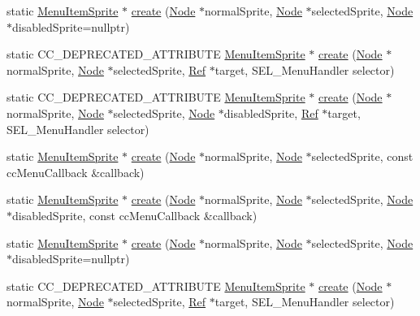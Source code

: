 \begin{DoxyCompactItemize}
\item 
static \hyperlink{classMenuItemSprite}{Menu\+Item\+Sprite} $\ast$ \hyperlink{classMenuItemSprite_ace4cc0187ff161f1fc3b2d0877b5b00f}{create} (\hyperlink{classNode}{Node} $\ast$normal\+Sprite, \hyperlink{classNode}{Node} $\ast$selected\+Sprite, \hyperlink{classNode}{Node} $\ast$disabled\+Sprite=nullptr)
\item 
static C\+C\+\_\+\+D\+E\+P\+R\+E\+C\+A\+T\+E\+D\+\_\+\+A\+T\+T\+R\+I\+B\+U\+TE \hyperlink{classMenuItemSprite}{Menu\+Item\+Sprite} $\ast$ \hyperlink{classMenuItemSprite_a96aec305060ca3ab7ce8e15de7d7d3ff}{create} (\hyperlink{classNode}{Node} $\ast$normal\+Sprite, \hyperlink{classNode}{Node} $\ast$selected\+Sprite, \hyperlink{classRef}{Ref} $\ast$target, S\+E\+L\+\_\+\+Menu\+Handler selector)
\item 
static C\+C\+\_\+\+D\+E\+P\+R\+E\+C\+A\+T\+E\+D\+\_\+\+A\+T\+T\+R\+I\+B\+U\+TE \hyperlink{classMenuItemSprite}{Menu\+Item\+Sprite} $\ast$ \hyperlink{classMenuItemSprite_ab8917eb41cd1e3c545d6585d4454ef6b}{create} (\hyperlink{classNode}{Node} $\ast$normal\+Sprite, \hyperlink{classNode}{Node} $\ast$selected\+Sprite, \hyperlink{classNode}{Node} $\ast$disabled\+Sprite, \hyperlink{classRef}{Ref} $\ast$target, S\+E\+L\+\_\+\+Menu\+Handler selector)
\item 
static \hyperlink{classMenuItemSprite}{Menu\+Item\+Sprite} $\ast$ \hyperlink{classMenuItemSprite_af57ca0a6a30385d69ba63706f1720cca}{create} (\hyperlink{classNode}{Node} $\ast$normal\+Sprite, \hyperlink{classNode}{Node} $\ast$selected\+Sprite, const cc\+Menu\+Callback \&callback)
\item 
static \hyperlink{classMenuItemSprite}{Menu\+Item\+Sprite} $\ast$ \hyperlink{classMenuItemSprite_a21ac709eaea185cb630e665f62d1f453}{create} (\hyperlink{classNode}{Node} $\ast$normal\+Sprite, \hyperlink{classNode}{Node} $\ast$selected\+Sprite, \hyperlink{classNode}{Node} $\ast$disabled\+Sprite, const cc\+Menu\+Callback \&callback)
\item 
static \hyperlink{classMenuItemSprite}{Menu\+Item\+Sprite} $\ast$ \hyperlink{classMenuItemSprite_ae10169fd35fe93ab753cb128858a12da}{create} (\hyperlink{classNode}{Node} $\ast$normal\+Sprite, \hyperlink{classNode}{Node} $\ast$selected\+Sprite, \hyperlink{classNode}{Node} $\ast$disabled\+Sprite=nullptr)
\item 
static C\+C\+\_\+\+D\+E\+P\+R\+E\+C\+A\+T\+E\+D\+\_\+\+A\+T\+T\+R\+I\+B\+U\+TE \hyperlink{classMenuItemSprite}{Menu\+Item\+Sprite} $\ast$ \hyperlink{classMenuItemSprite_a45379baaef4691f9508d5e96374dba5d}{create} (\hyperlink{classNode}{Node} $\ast$normal\+Sprite, \hyperlink{classNode}{Node} $\ast$selected\+Sprite, \hyperlink{classRef}{Ref} $\ast$target, S\+E\+L\+\_\+\+Menu\+Handler selector)

\end{DoxyCompactItemize}
